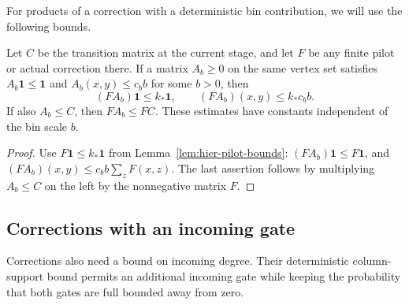 For products of a correction with a deterministic bin contribution, we
will use the following bounds.

\begin{lemma}
\label{lem:hier-bin-products}
Let $C$ be the transition matrix at the current stage, and let $F$ be
any finite pilot or actual correction there.  If a matrix $A_b\geq0$
on the same vertex set satisfies $A_b\mathbf 1\leq\mathbf 1$ and
$A_b(x,y)\leq c_b b$ for some $b>0$, then
\[
 (FA_b)\mathbf 1\leq k_*\mathbf 1,
 \qquad (FA_b)(x,y)\leq k_*c_b b.
\]
If also $A_b\leq C$, then $FA_b\leq FC$.  These estimates have constants
independent of the bin scale $b$.
\end{lemma}

\begin{proof}
Use $F\mathbf 1\leq k_*\mathbf 1$ from
Lemma~\ref{lem:hier-pilot-bounds}:
$(FA_b)\mathbf 1\leq F\mathbf 1$, and
$(FA_b)(x,y)\leq c_b b\sum_zF(x,z)$.  The last assertion follows by
multiplying $A_b\leq C$ on the left by the nonnegative matrix $F$.
\end{proof}

\subsection{Corrections with an incoming gate}

Corrections also need a bound on incoming degree.  Their deterministic
column-support bound permits an additional incoming gate while keeping
the probability that both gates are full bounded away from zero.

